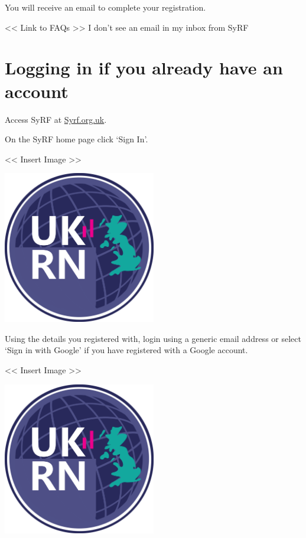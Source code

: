 \documentclass[]{book}
\begin{document}
You will receive an email to complete your registration.

\textless{}\textless{} Link to FAQs \textgreater{}\textgreater{} I don't
see an email in my inbox from SyRF

\section{Logging in if you already have an
account}\label{logging-in-if-you-already-have-an-account}

Access SyRF at \href{http://syrf.org.uk}{Syrf.org.uk}.

On the SyRF home page click `Sign In'.

\textless{}\textless{} Insert Image \textgreater{}\textgreater{}

\includegraphics[width=0.50000\textwidth,height=0.50000\textwidth]{figs/evidence-triangle.png}

Using the details you registered with, login using a generic email
address or select `Sign in with Google' if you have registered with a
Google account.

\textless{}\textless{} Insert Image \textgreater{}\textgreater{}

\includegraphics[width=0.50000\textwidth,height=0.50000\textwidth]{figs/evidence-triangle.png}
\end{document}
